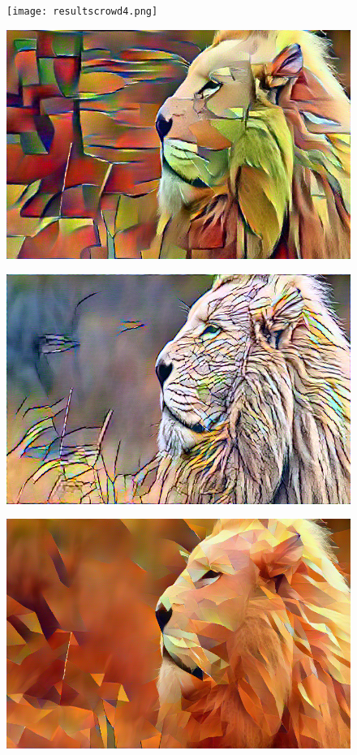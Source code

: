 \documentclass[17pt]{extarticle}
\begin{document}
\begin{figure}[h]
  		\texttt{[image: resultscrowd4.png]}
\end{figure}


\begin{figure}
  \includegraphics[scale=0.93]{lioncubism.png}
\end{figure}
\begin{figure}
  \includegraphics[scale=0.93]{lionmosaic.png}
\end{figure}
\begin{figure}
  \includegraphics[scale=0.7]{lionpolyphoenix.png}
\end{figure}
\end{document}
